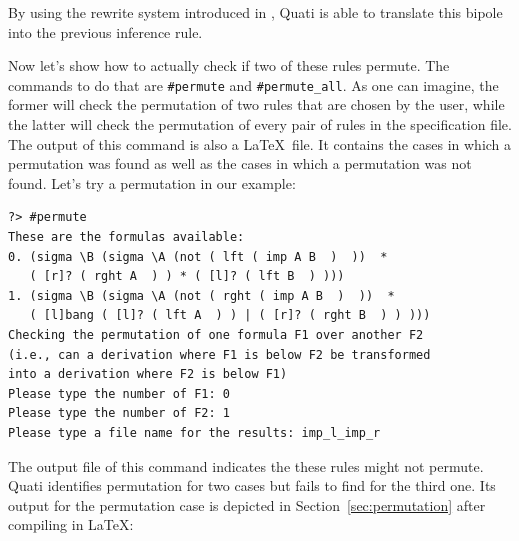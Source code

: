 \documentclass{llncs}
\begin{document}
By using the rewrite system introduced in \cite{nigam13iclp}, Quati is able to
translate this bipole into the previous inference rule.

Now let's show how to actually check if two of these rules permute. The commands
to do that are \texttt{\#permute} and \texttt{\#permute\_all}. As one can
imagine, the former will check the permutation of two rules that are chosen by
the user, while the latter will check the permutation of every pair of rules in
the specification file. The output of this command is also a \LaTeX\ file. It
contains the cases in which a permutation was found as well as the cases in
which a permutation was not found. Let's try a permutation in our example:
\vspace{-1mm}

{\small
\begin{verbatim}
?> #permute
These are the formulas available: 
0. (sigma \B (sigma \A (not ( lft ( imp A B  )  ))  * 
   ( [r]? ( rght A  ) ) * ( [l]? ( lft B  ) )))
1. (sigma \B (sigma \A (not ( rght ( imp A B  )  ))  * 
   ( [l]bang ( [l]? ( lft A  ) ) | ( [r]? ( rght B  ) ) )))
Checking the permutation of one formula F1 over another F2 
(i.e., can a derivation where F1 is below F2 be transformed 
into a derivation where F2 is below F1) 
Please type the number of F1: 0
Please type the number of F2: 1
Please type a file name for the results: imp_l_imp_r
\end{verbatim}
}

The output file of this command indicates the these rules might not permute.
Quati identifies permutation for two cases but fails to find for the third one.
Its output for the permutation case is depicted in Section~\ref{sec:permutation} 
after compiling in \LaTeX:

\begin{landscape}

\end{landscape}

%
\end{document}
